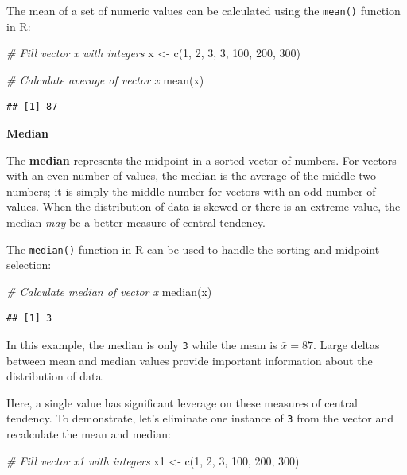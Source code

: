 \documentclass[
]{book}
\newenvironment{Shaded}{\begin{snugshade}}{\end{snugshade}}
\newcommand{\CommentTok}[1]{\textcolor[rgb]{0.56,0.35,0.01}{\textit{#1}}}
\newcommand{\DecValTok}[1]{\textcolor[rgb]{0.00,0.00,0.81}{#1}}
\newcommand{\FunctionTok}[1]{\textcolor[rgb]{0.00,0.00,0.00}{#1}}
\newcommand{\NormalTok}[1]{#1}
\newcommand{\OtherTok}[1]{\textcolor[rgb]{0.56,0.35,0.01}{#1}}
\begin{document}
The mean of a set of numeric values can be calculated using the \texttt{mean()} function in R:

\begin{Shaded}
\begin{Highlighting}[]
\CommentTok{\# Fill vector x with integers}
\NormalTok{x }\OtherTok{\textless{}{-}} \FunctionTok{c}\NormalTok{(}\DecValTok{1}\NormalTok{, }\DecValTok{2}\NormalTok{, }\DecValTok{3}\NormalTok{, }\DecValTok{3}\NormalTok{, }\DecValTok{100}\NormalTok{, }\DecValTok{200}\NormalTok{, }\DecValTok{300}\NormalTok{)}

\CommentTok{\# Calculate average of vector x}
\FunctionTok{mean}\NormalTok{(x)}
\end{Highlighting}
\end{Shaded}

\begin{verbatim}
## [1] 87
\end{verbatim}

\textbf{Median}

The \textbf{median} represents the midpoint in a sorted vector of numbers. For vectors with an even number of values, the median is the average of the middle two numbers; it is simply the middle number for vectors with an odd number of values. When the distribution of data is skewed or there is an extreme value, the median \emph{may} be a better measure of central tendency.

The \texttt{median()} function in R can be used to handle the sorting and midpoint selection:

\begin{Shaded}
\begin{Highlighting}[]
\CommentTok{\# Calculate median of vector x}
\FunctionTok{median}\NormalTok{(x)}
\end{Highlighting}
\end{Shaded}

\begin{verbatim}
## [1] 3
\end{verbatim}

In this example, the median is only \texttt{3} while the mean is \(\bar{x} = 87\). Large deltas between mean and median values provide important information about the distribution of data.

Here, a single value has significant leverage on these measures of central tendency. To demonstrate, let's eliminate one instance of \texttt{3} from the vector and recalculate the mean and median:

\begin{Shaded}
\begin{Highlighting}[]
\CommentTok{\# Fill vector x1 with integers}
\NormalTok{x1 }\OtherTok{\textless{}{-}} \FunctionTok{c}\NormalTok{(}\DecValTok{1}\NormalTok{, }\DecValTok{2}\NormalTok{, }\DecValTok{3}\NormalTok{, }\DecValTok{100}\NormalTok{, }\DecValTok{200}\NormalTok{, }\DecValTok{300}\NormalTok{)}
\end{Highlighting}
\end{Shaded}
\end{document}
